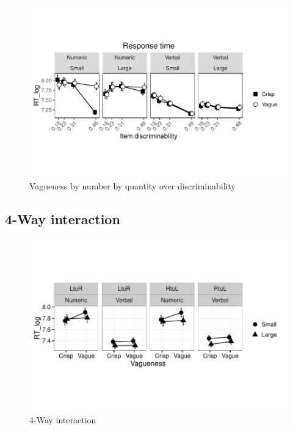 \documentclass[a4paper,12pt,twoside]{article}\usepackage[]{graphicx}\usepackage[]{color}
\makeatletter
\def\maxwidth{ %
  \ifdim\Gin@nat@width>\linewidth
    \linewidth
  \else
    \Gin@nat@width
  \fi
}
\newenvironment{knitrout}{}{} %
\makeatother
\begin{document}
\begin{knitrout}\scriptsize
{}\color{fgcolor}\begin{figure}[hbtp]

{\centering \includegraphics[width=\maxwidth]{figure/graphics-vnitems-1} 

}

\caption[Vagueness by number by quantity over discriminability]{Vagueness by number by quantity over discriminability}\label{fig:vnitems}
\end{figure}


\end{knitrout}

\clearpage
\subsection{4-Way interaction}


\begin{knitrout}\scriptsize
{}\color{fgcolor}\begin{figure}[hbtp]

{\centering \includegraphics[width=\maxwidth]{figure/graphics-4way-1} 

}

\caption[4-Way interaction]{4-Way interaction}\label{fig:4way}
\end{figure}


\end{knitrout}
\end{document}
